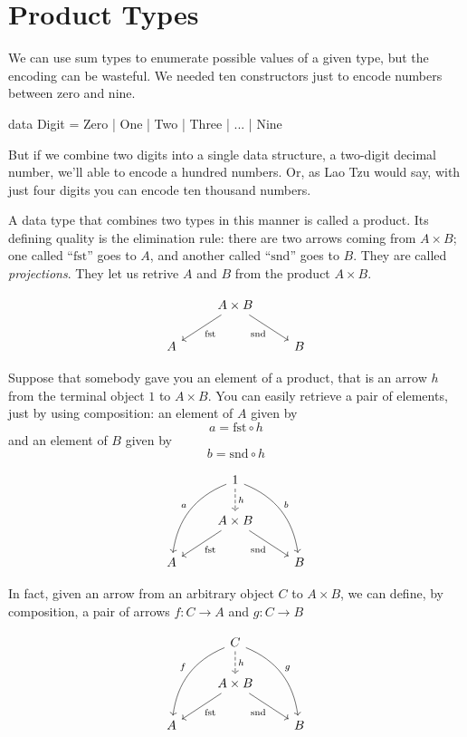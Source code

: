 \documentclass[DaoFP]{subfiles}
\begin{document}
\setcounter{chapter}{4}

\chapter{Product Types}

We can use sum types to enumerate possible values of a given type, but the encoding can be wasteful. We needed ten constructors just to encode numbers between zero and nine.
\begin{haskell}
data Digit = Zero | One | Two | Three | ... | Nine
\end{haskell}
But if we combine two digits into a single data structure, a two-digit decimal number, we'll able to encode a hundred numbers. Or, as Lao Tzu would say, with just four digits you can encode ten thousand numbers.

A data type that combines two types in this manner is called a product. Its defining quality is the elimination rule: there are two arrows coming from $A \times B$; one called ``$\text{fst}$'' goes to $A$, and another called ``$\text{snd}$'' goes to $B$. They are called \emph{projections}. They let us retrive $A$ and $B$ from the product $A \times B$.

\[
 \begin{tikzcd}
& A \times B
 \arrow[dl,  "\text{fst}"]
 \arrow[dr,   "\text{snd}"']
\\
A && B
 \end{tikzcd}
\]

Suppose that somebody gave you an element of a product, that is an arrow $h$ from the terminal object $1$ to $A \times B$. You can easily retrieve a pair of elements, just by using composition: an element of $A$ given by 
\[a = \text{fst} \circ h \]
and an element of $B$ given by
\[b = \text{snd} \circ h \]

\[
 \begin{tikzcd}
 & 1
\arrow[d, dashed, "h"]
 \arrow[ddl, bend right, "a"']
 \arrow[ddr, bend left, "b"]
\\
&A \times B
 \arrow[dl,  "\text{fst}"]
 \arrow[dr,   "\text{snd}"']
\\
A && B
 \end{tikzcd}
\]

In fact, given an arrow from an arbitrary object $C$ to $A \times B$, we can define, by composition, a pair of arrows $f \colon C \to A$ and $g \colon C \to B$

\[
 \begin{tikzcd}
 & C
\arrow[d, dashed, "h"]
 \arrow[ddl, bend right, "f"']
 \arrow[ddr, bend left, "g"]
\\
&A \times B
 \arrow[dl,  "\text{fst}"]
  \arrow[dr,   "\text{snd}"']
\\
A && B
 \end{tikzcd}
\]
\end{document}

